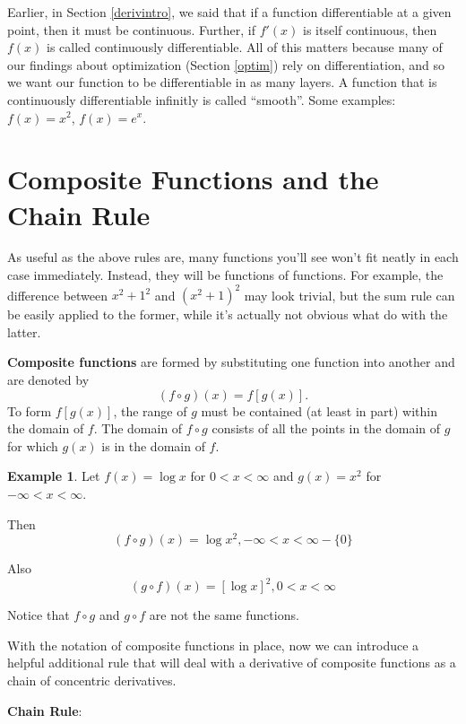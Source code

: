 \documentclass[
]{book}
\theoremstyle{definition}
\theoremstyle{definition}
\newtheorem{example}{Example}[chapter]
\theoremstyle{definition}
\theoremstyle{definition}
\theoremstyle{remark}
\begin{document}
Earlier, in Section \ref{derivintro}, we said that if a function differentiable at a given point, then it must be continuous. Further, if \(f'(x)\) is itself continuous, then \(f(x)\) is called continuously differentiable. All of this matters because many of our findings about optimization (Section \ref{optim}) rely on differentiation, and so we want our function to be differentiable in as many layers. A function that is continuously differentiable infinitly is called ``smooth''. Some examples: \(f(x) = x^2\), \(f(x) = e^x\).

\hypertarget{composite-functions-and-the-chain-rule}{%
\section{Composite Functions and the Chain Rule}\label{composite-functions-and-the-chain-rule}}

As useful as the above rules are, many functions you'll see won't fit neatly in each case immediately. Instead, they will be functions of functions. For example, the difference between \(x^2 + 1^2\) and \((x^2 + 1)^2\) may look trivial, but the sum rule can be easily applied to the former, while it's actually not obvious what do with the latter.

\textbf{Composite functions} are formed by substituting one function into another and are denoted by \[(f\circ g)(x)=f[g(x)].\] To form \(f[g(x)]\), the range of \(g\) must be contained (at least in part) within the domain of \(f\). The domain of \(f\circ g\) consists of all the points in the domain of \(g\) for which \(g(x)\) is in the domain of \(f\).

\begin{example}
\protect\hypertarget{exm:unnamed-chunk-204}{}{\label{exm:unnamed-chunk-204} }Let \(f(x)=\log x\) for \(0<x<\infty\) and \(g(x)=x^2\) for \(-\infty<x<\infty\).

Then
\[(f\circ g)(x)=\log x^2, -\infty<x<\infty - \{0\}\]

Also
\[(g\circ f)(x)=[\log x]^2, 0<x<\infty\]

Notice that \(f\circ g\) and \(g\circ f\) are not the same functions.
\end{example}

With the notation of composite functions in place, now we can introduce a helpful additional rule that will deal with a derivative of composite functions as a chain of concentric derivatives.

\textbf{Chain Rule}:
\end{document}
